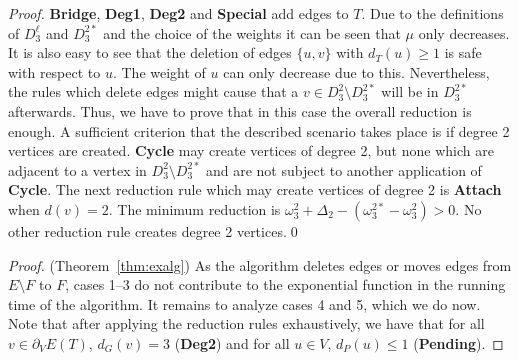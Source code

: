 \documentclass{llncs}
\newcommand{\longversion}[1]{#1}
\begin{document}
\longversion{
\begin{proof}
{\bf Bridge}, {\bf Deg1}, {\bf Deg2} and {\bf Special} add edges to $T$. Due to the definitions of $D_3^\ell$ and $D_3^{2\ast}$ and the
 choice of the weights it can be seen that $\mu$ only decreases. It is also easy to see that the deletion of edges $\{u,v\}$ with $d_T(u)\ge 1$ is
safe with respect to $u$. The weight of $u$ can only decrease due to this. Nevertheless, the rules which delete edges might cause that a $v \in
D_3^{2}\setminus D_3^{2\ast}$ will be in $D_3^{2\ast}$ afterwards. Thus, we have to prove that in this case the overall reduction is enough. A
sufficient criterion that the described scenario takes place is if degree 2 vertices are created. {\bf Cycle} may create vertices of degree 2, but
none which are adjacent to a vertex in $D_3^{2}\setminus D_3^{2\ast}$ and are not subject to another application of {\bf Cycle}. The next reduction
rule which may create vertices of degree 2 is {\bf Attach} when $d(v)=2$. The minimum reduction is $\omega_3^2+ \Delta_2
-(\omega_3^{2\ast}-\omega_3^2)>0$. No other reduction rule creates degree 2 vertices.\qed
\end{proof}

\begin{proof} (Theorem~\ref{thm:exalg}) 
As the algorithm deletes edges or moves edges from $E\setminus F$ to $F$, cases 1--3 do not contribute to the exponential function in the running time of the algorithm. It remains to analyze cases 4 and 5, which we do now. Note that after applying the reduction rules exhaustively, we have that for all $v \in \partial_V E(T)$, $d_G(v)=3$ ({\bf Deg2}) and for all $u \in V$, $d_P(u) \le 1$ ({\bf Pending}).



\end{proof}}
\end{document}
